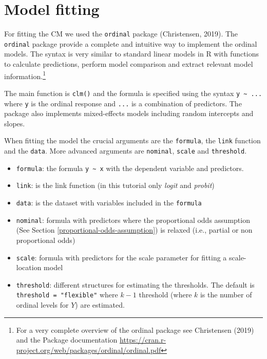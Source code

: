 \documentclass[
  man,floatsintext]{apa6}
\providecommand{\tightlist}{%
  \setlength{\itemsep}{0pt}\setlength{\parskip}{0pt}}
\begin{document}
\normalsize

\scriptsize

\normalsize

\section{Model fitting}\label{model-fitting}

For fitting the CM we used the \texttt{ordinal} package (Christensen, 2019). The \texttt{ordinal} package provide a complete and intuitive way to implement the ordinal models. The syntax is very similar to standard linear models in R with functions to calculate predictions, perform model comparison and extract relevant model information.\footnote{For a very complete overview of the ordinal package see Christensen (2019) and the Package documentation \url{https://cran.r-project.org/web/packages/ordinal/ordinal.pdf}}

The main function is \texttt{clm()} and the formula is specified using the syntax \texttt{y\ \textasciitilde{}\ ...} where \texttt{y} is the ordinal response and \texttt{...} is a combination of predictors. The package also implements mixed-effects models including random intercepts and slopes.

When fitting the model the crucial arguments are the \texttt{formula}, the \texttt{link} function and the \texttt{data}. More advanced arguments are \texttt{nominal}, \texttt{scale} and \texttt{threshold}.

\begin{itemize}
\tightlist
\item
  \texttt{formula}: the formula \texttt{y\ \textasciitilde{}\ x} with the dependent variable and predictors.
\item
  \texttt{link}: is the link function (in this tutorial only \emph{logit} and \emph{probit})
\item
  \texttt{data}: is the dataset with variables included in the \texttt{formula}
\item
  \texttt{nominal}: formula with predictors where the proportional odds assumption (See Section \ref{proportional-odds-assumption}) is relaxed (i.e., partial or non proportional odds)
\item
  \texttt{scale}: formula with predictors for the scale parameter for fitting a scale-location model
\item
  \texttt{threshold}: different structures for estimating the thresholds. The default is \texttt{threshold\ =\ "flexible"} where \(k - 1\) threshold (where \(k\) is the number of ordinal levels for \(Y\)) are estimated.
\end{itemize}
\end{document}
